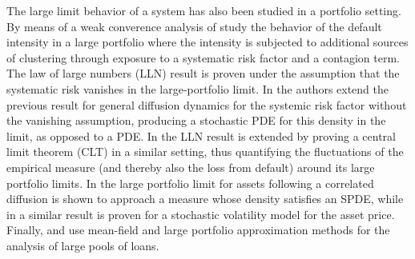 \documentclass[10pt]{article}
\theoremstyle{plain}
\theoremstyle{definition}
\newcommand{\<}{\langle}
\renewcommand{\>}{\rangle}
\renewcommand{\(}{\left(}
\renewcommand{\)}{\right)}
\renewcommand{\[}{\left[}
\renewcommand{\]}{\right]}
\begin{document}
The large limit behavior of a system has also been studied in a portfolio setting. By means of a weak converence analysis of \citet{giesecke13} study the behavior of the default intensity in a large portfolio where the intensity is subjected to additional sources of clustering through exposure to a systematic risk factor and a contagion term. The law of large numbers (LLN) result is proven under the assumption that the systematic risk vanishes in the large-portfolio limit. In \citet{giesecke15} the authors extend the previous result for general diffusion dynamics for the systemic risk factor without the vanishing assumption, producing a stochastic PDE for this density in the limit, as opposed to a PDE. In \citet{spiliopoulos14} the LLN result is extended by proving a central limit theorem (CLT) in a similar setting, thus quantifying the fluctuations of the empirical measure (and thereby also the loss from default) around its large portfolio limits. In \citet{bush11} the large portfolio limit for assets following a correlated diffusion is shown to approach a measure whose density satisfies an SPDE, while in \citet{hambly17} a similar result is proven for a stochastic volatility model for the asset price. Finally, \citet{sirignano15} and \citet{sirignano16} use mean-field and large portfolio approximation methods for the analysis of large pools of loans. 

\end{document}
